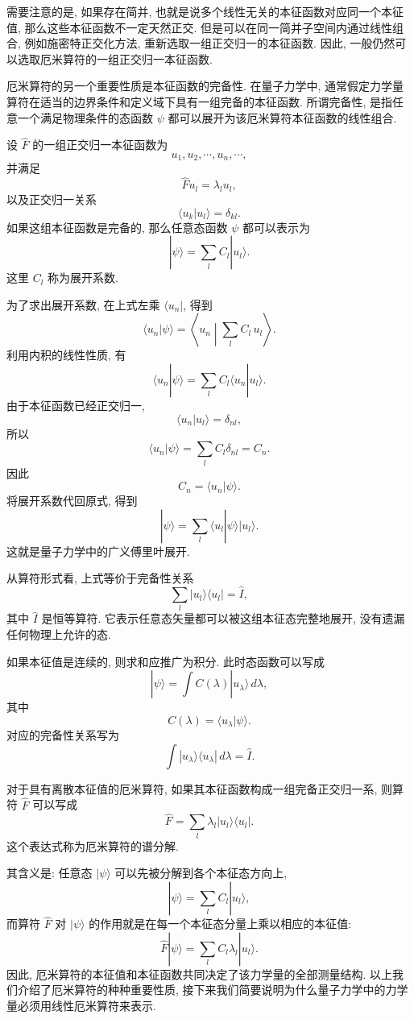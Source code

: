 需要注意的是, 如果存在简并, 也就是说多个线性无关的本征函数对应同一个本征值, 那么这些本征函数不一定天然正交. 但是可以在同一简并子空间内通过线性组合, 例如施密特正交化方法, 重新选取一组正交归一的本征函数. 因此, 一般仍然可以选取厄米算符的一组正交归一本征函数.


厄米算符的另一个重要性质是本征函数的完备性. 在量子力学中, 通常假定力学量算符在适当的边界条件和定义域下具有一组完备的本征函数. 所谓完备性, 是指任意一个满足物理条件的态函数 $\psi$ 都可以展开为该厄米算符本征函数的线性组合.

设 $\hat F$ 的一组正交归一本征函数为
\[
u_1, u_2, \cdots, u_n, \cdots,
\]
并满足
\[
\hat F u_l=\lambda_l u_l,
\]
以及正交归一关系
\[
\langle u_k|u_l\rangle=\delta_{kl}.
\]
如果这组本征函数是完备的, 那么任意态函数 $\psi$ 都可以表示为
\[
|\psi\rangle=\sum_l C_l|u_l\rangle .
\]
这里 $C_l$ 称为展开系数.

为了求出展开系数, 在上式左乘 $\langle u_n|$, 得到
\[
\langle u_n|\psi\rangle
=
\left\langle u_n\middle|\sum_l C_l\,u_l\right\rangle .
\]
利用内积的线性性质, 有
\[
\langle u_n|\psi\rangle
=
\sum_l C_l\langle u_n|u_l\rangle .
\]
由于本征函数已经正交归一,
\[
\langle u_n|u_l\rangle=\delta_{nl},
\]
所以
\[
\langle u_n|\psi\rangle
=
\sum_l C_l\delta_{nl}
=
C_n.
\]
因此
\[
C_n=\langle u_n|\psi\rangle .
\]
将展开系数代回原式, 得到
\[
|\psi\rangle
=
\sum_l \langle u_l|\psi\rangle |u_l\rangle .
\]
这就是量子力学中的广义傅里叶展开.

从算符形式看, 上式等价于完备性关系
\[
\sum_l |u_l\rangle\langle u_l|=\hat I,
\]
其中 $\hat I$ 是恒等算符. 它表示任意态矢量都可以被这组本征态完整地展开, 没有遗漏任何物理上允许的态.

如果本征值是连续的, 则求和应推广为积分. 此时态函数可以写成
\[
|\psi\rangle=\int C(\lambda)|u_\lambda\rangle\, d\lambda,
\]
其中
\[
C(\lambda)=\langle u_\lambda|\psi\rangle .
\]
对应的完备性关系写为
\[
\int |u_\lambda\rangle\langle u_\lambda|\, d\lambda=\hat I.
\]

对于具有离散本征值的厄米算符, 如果其本征函数构成一组完备正交归一系, 则算符 $\hat F$ 可以写成
\[
\hat F
=
\sum_l \lambda_l |u_l\rangle\langle u_l| .
\]
这个表达式称为厄米算符的谱分解.

其含义是: 任意态 $|\psi\rangle$ 可以先被分解到各个本征态方向上,
\[
|\psi\rangle=\sum_l C_l|u_l\rangle,
\]
而算符 $\hat F$ 对 $|\psi\rangle$ 的作用就是在每一个本征态分量上乘以相应的本征值:
\[
\hat F|\psi\rangle
=
\sum_l C_l\lambda_l|u_l\rangle .
\]
因此, 厄米算符的本征值和本征函数共同决定了该力学量的全部测量结构. 以上我们介绍了厄米算符的种种重要性质, 接下来我们简要说明为什么量子力学中的力学量必须用线性厄米算符来表示.

